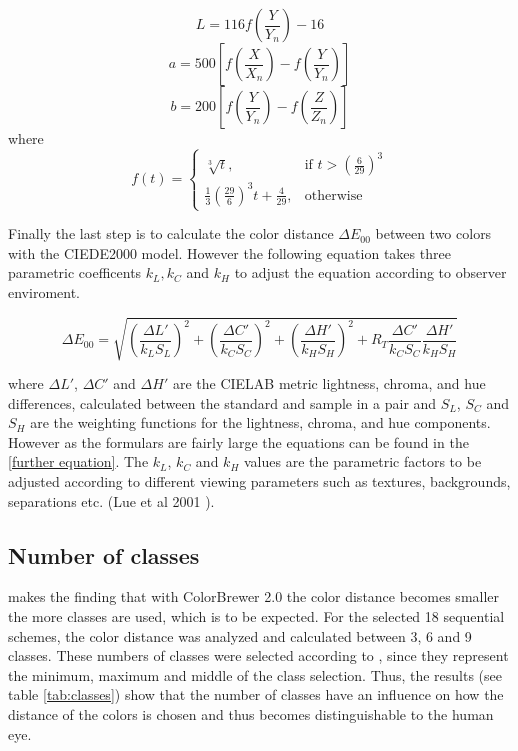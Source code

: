 \begin{equation}
L = 116 f\left(\frac{Y}{Y_{n}}\right)-16
\end{equation}
\begin{equation}
a = 500 \left[f\left(\frac{X}{X_{n}}\right)-f\left(\frac{Y}{Y_n}\right)\right]
\end{equation}
\begin{equation}
b = 200 \left[f\left(\frac{Y}{Y_{n}}\right)-f\left(\frac{Z}{Z_n}\right)\right]
\end{equation}
where
\begin{equation}
f(t) =
\begin{cases}
	\sqrt[3]{t}, & \text{if $t > (\frac{6}{29})^{3}$}\\
	\frac{1}{3}(\frac{29}{6})^{3}t+\frac{4}{29}, & \text{otherwise}
\end{cases}
\end{equation}

Finally the last step is to calculate the color distance $\Delta E_{00}$ between two colors with the CIEDE2000 model. However the following equation takes three parametric coefficents $k_{L}, k_{C}$ and $k_{H}$ to adjust the equation according to observer enviroment.

\begin{equation}
\Delta E_{00}= \sqrt{\left(\frac{\Delta L'}{k_{L}S_{L}}\right)^{2}+\left(\frac{\Delta C'}{k_{C}S_{C}}\right)^{2}+\left(\frac{\Delta H'}{k_{H}S_{H}}\right)^{2}+R_{T}\frac{\Delta C'}{k_{C}S_{C}}\frac{\Delta H'}{k_{H}S_{H}}}
\end{equation}

where $\Delta L'$, $\Delta C'$ and $\Delta H'$ are the CIELAB metric lightness, chroma, and hue differences, calculated
between the standard and sample in a pair and $S_{L}$, $S_{C}$ and $S_{H}$ are the weighting functions for the lightness,
chroma, and hue components. However as the formulars are fairly large the equations can be found in the \ref{further equation}.
The $k_{L}$, $k_{C}$ and $k_{H}$ values are the parametric factors to be adjusted according to different viewing parameters such as textures, backgrounds, separations etc. (Lue et al 2001 \parencite{brychtova2015}). 
\subsection{Number of classes}
\textcite{brychtova2017} makes the finding that with ColorBrewer 2.0 the color distance becomes smaller the more classes are used, which is to be expected. For the selected 18 sequential schemes, the color distance was analyzed and calculated between 3, 6 and 9 classes. These numbers of classes were selected according to \textcite{brychtova2017}, since they represent the minimum, maximum and middle of the class selection. Thus, the results (see table \ref{tab:classes}) show that the number of classes have an influence on how the distance of the colors is chosen and thus becomes distinguishable to the human eye. 

